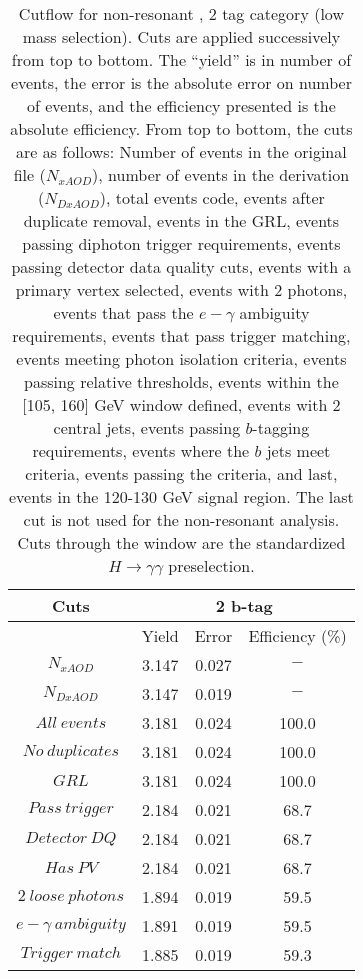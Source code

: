 \begin{table}\footnotesize
\begin{center}
\caption[Cutflow for non-resonant \hhyybb, 2 tag category (low mass selection)]{Cutflow for non-resonant \hhyybb, 2 tag category (low mass selection). Cuts are applied successively from top to bottom. The ``yield'' is in number of events, the error is the absolute error on number of events, and the efficiency presented is the absolute efficiency. From top to bottom, the cuts are as follows: Number of events in the original file ($N_{xAOD}$), number of events in the derivation ($N_{DxAOD}$), total events code, events after duplicate removal, events in the \gls{GRL}, events passing diphoton trigger requirements, events passing detector data quality cuts, events with a primary vertex selected, events with 2 photons, events that pass the $e-\gamma$ ambiguity requirements, events that pass trigger matching, events meeting photon isolation criteria, events passing relative \pt thresholds, events within the [105, 160] GeV \myy window defined, events with 2 central jets, events passing $b$-tagging requirements, events where the $b$ jets meet criteria, events passing the \mbb criteria, and last, events in the 120-130 GeV \yy signal region. The last cut is not used for the non-resonant analysis. Cuts through the \myy window are the standardized $H \rightarrow \gamma \gamma$ preselection.}
\label{tab:cutflow-nonres-2tag-low}
\begin{tabular}{|c|c|c|c|}
 \hline
Cuts& \multicolumn{3}{c|}{2 b-tag} \\ \hline
 &Yield&Error&Efficiency (\%)\\ \hline
$N_{xAOD}$ & 3.147&0.027 &$-$ \\
 \hline
$N_{DxAOD}$ & 3.147&0.019 &$-$ \\
 \hline
$All\ events$ & 3.181&0.024 &100.0 \\
 \hline
$No\ duplicates$ & 3.181&0.024 &100.0 \\
 \hline
$GRL$ & 3.181&0.024 &100.0 \\
 \hline
$Pass\ trigger$ & 2.184&0.021 &68.7 \\
 \hline
$Detector\ DQ$ & 2.184&0.021 &68.7 \\
 \hline
$Has\ PV$ & 2.184&0.021 &68.7 \\
 \hline
$2\ loose\ photons$ & 1.894&0.019 &59.5 \\
 \hline
$e-\gamma\ ambiguity$ & 1.891&0.019 &59.5 \\
 \hline
$Trigger\ match$ & 1.885&0.019 &59.3 \\

\end{tabular}
\end{center}
\end{table}
